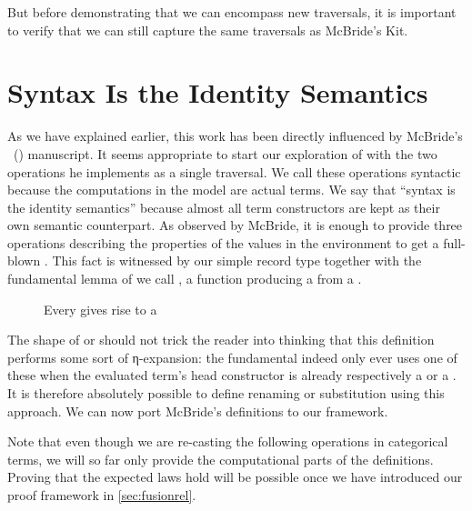 But before demonstrating that we can encompass new traversals, it is important
to verify that we can still capture the same traversals as McBride's Kit.

\section{Syntax Is the Identity Semantics}
\label{sec:syntactic}

As we have explained earlier, this work has been directly influenced by
McBride's ~(\citeyear{mcbride2005type}) manuscript. It seems appropriate
to start our exploration of  with the two operations he
implements as a single traversal. We call these operations syntactic
because the computations in the model are actual terms. We say that ``syntax
is the identity semantics'' because almost all term constructors are kept
as their own semantic counterpart. As observed by
McBride, it is enough to provide three operations describing the properties
of the values in the environment to get a full-blown . This
fact is witnessed by our simple  record type together with
the fundamental lemma of  we call , a function
producing a  from a .

\begin{figure}[h]
\caption{Every  gives rise to a \label{fig:syntactic}}
\end{figure}

The shape of  or  should not trick the reader
into thinking that this definition performs some sort of η-expansion:
the fundamental  indeed only ever uses one of these when the
evaluated term's head constructor is already respectively a 
or a . It is therefore absolutely possible to define renaming
or substitution using this approach. We can now port McBride's definitions
to our framework.

\begin{remark}
Note that even though we are re-casting the following operations in
categorical terms, we will so far only provide the computational parts
of the definitions. Proving that the expected laws hold will be possible
once we have introduced our proof framework in \cref{sec:fusionrel}.
\end{remark}

